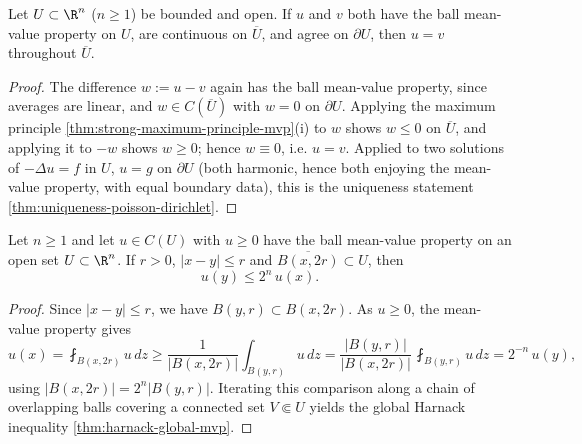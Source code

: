 \begin{theorem}
\label{thm:uniqueness-dirichlet-mvp}
\leanok
Let $U \subset \R^n$ ($n \ge 1$) be bounded and open. If $u$ and $v$ both have the ball
mean-value property on $U$, are continuous on $\overline{U}$, and agree on
$\partial U$, then $u = v$ throughout $\overline{U}$.
\end{theorem}

\begin{proof}
\leanok
The difference $w := u - v$ again has the ball mean-value property, since averages are
linear, and $w \in C(\overline{U})$ with $w = 0$ on $\partial U$. Applying the maximum
principle \cref{thm:strong-maximum-principle-mvp}(i) to $w$ shows $w \le 0$ on
$\overline{U}$, and applying it to $-w$ shows $w \ge 0$; hence $w \equiv 0$, i.e.
$u = v$. Applied to two solutions of $-\Delta u = f$ in $U$, $u = g$ on $\partial U$
(both harmonic, hence both enjoying the mean-value property, with equal boundary data),
this is the uniqueness statement \cref{thm:uniqueness-poisson-dirichlet}.
\end{proof}

\begin{theorem}
\label{thm:harnack-local-mvp}
\leanok
Let $n \ge 1$ and let $u \in C(U)$ with $u \ge 0$ have the ball mean-value property on an
open set $U \subset \R^n$. If $r > 0$, $|x - y| \le r$ and $\overline{B(x,2r)} \subset U$,
then
$$u(y) \le 2^n\, u(x).$$
\end{theorem}

\begin{proof}
\leanok
Since $|x - y| \le r$, we have $B(y,r) \subset B(x,2r)$. As $u \ge 0$, the mean-value
property gives
$$u(x) = \fint_{B(x,2r)} u \, dz
  \ge \frac{1}{|B(x,2r)|}\int_{B(y,r)} u \, dz
  = \frac{|B(y,r)|}{|B(x,2r)|}\,\fint_{B(y,r)} u \, dz
  = 2^{-n}\, u(y),$$
using $|B(x,2r)| = 2^n |B(y,r)|$. Iterating this comparison along a chain of overlapping
balls covering a connected set $V \Subset U$ yields the global Harnack inequality
\cref{thm:harnack-global-mvp}.
\end{proof}

